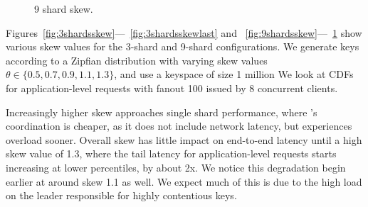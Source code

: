 \begin{figure}[tbp]
{  \label{fig:9shardsskewlast}
}
\caption{9 shard skew.}
\end{figure}


Figures~\ref{fig:3shardsskew}---~\ref{fig:3shardsskewlast} and
~\ref{fig:9shardsskew}---~\ref{fig:9shardsskewlast} show various skew values for
the 3-shard and 9-shard configurations.  We generate keys according to a Zipfian
distribution with varying skew values $\theta \in \{0.5, 0.7, 0.9, 1.1, 1.3\}$,
and use a keyspace of size 1 million We look at CDFs for application-level
requests with fanout 100 issued by 8 concurrent clients.

Increasingly higher skew approaches single shard performance, where \system's
coordination is cheaper, as it does not include network latency, but experiences
overload sooner.  Overall skew has little impact on end-to-end latency until a
high skew value of 1.3, where the tail latency for application-level requests
starts increasing at lower percentiles, by about 2x. We notice this degradation
begin earlier at around skew 1.1 as well. We expect much of this is due to the
high load on the leader responsible for highly contentious keys.

